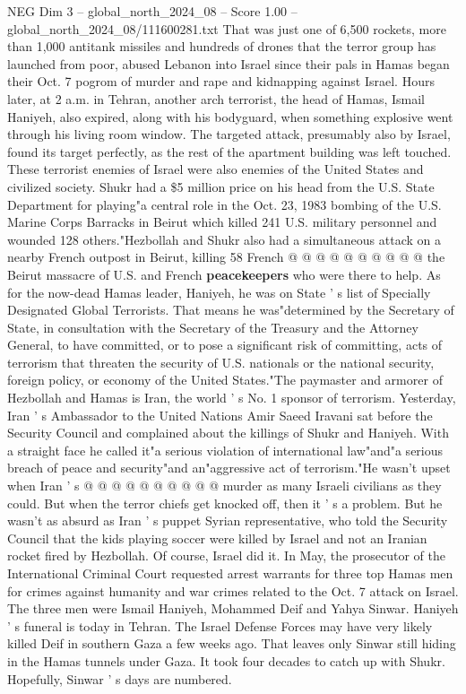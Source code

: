 \begin{textsample}{NEG Dim 3 – global\_north\_2024\_08 – Score 1.00 – global\_north\_2024\_08/111600281.txt}  \label{ex:f3_neg_316}
That was just one of 6,500 rockets, more than 1,000 antitank missiles and hundreds of drones that the terror group has launched from poor, abused Lebanon into Israel since their pals in Hamas began their Oct. 7 pogrom of murder and rape and kidnapping against Israel.
Hours later, at 2 a.m. in Tehran, another arch terrorist, the head of Hamas, Ismail Haniyeh, also expired, along with his bodyguard, when something explosive went through his living room window.
The targeted attack, presumably also by Israel, found its target perfectly, as the rest of the apartment building was left touched.
These terrorist enemies of Israel were also enemies of the United States and civilized society.
Shukr had a \$5 million price on his head from the U.S.
State Department for playing"a central role in the Oct. 23, 1983 bombing of the U.S.
Marine Corps Barracks in Beirut which killed 241 U.S. military personnel and wounded 128 others."Hezbollah and Shukr also had a simultaneous attack on a nearby French outpost in Beirut, killing 58 French @ @ @ @ @ @ @ @ @ @ the Beirut massacre of U.S. and French \textbf{peacekeepers} who were there to help.
As for the now-dead Hamas leader, Haniyeh, he was on State ' s list of Specially Designated Global Terrorists.
That means he was"determined by the Secretary of State, in consultation with the Secretary of the Treasury and the Attorney General, to have committed, or to pose a significant risk of committing, acts of terrorism that threaten the security of U.S. nationals or the national security, foreign policy, or economy of the United States."The paymaster and armorer of Hezbollah and Hamas is Iran, the world ' s No. 1 sponsor of terrorism.
Yesterday, Iran ' s Ambassador to the United Nations Amir Saeed Iravani sat before the Security Council and complained about the killings of Shukr and Haniyeh.
With a straight face he called it"a serious violation of international law"and"a serious breach of peace and security"and an"aggressive act of terrorism."He wasn't upset when Iran ' s @ @ @ @ @ @ @ @ @ @ murder as many Israeli civilians as they could.
But when the terror chiefs get knocked off, then it ' s a problem.
But he wasn't as absurd as Iran ' s puppet Syrian representative, who told the Security Council that the kids playing soccer were killed by Israel and not an Iranian rocket fired by Hezbollah.
Of course, Israel did it.
In May, the prosecutor of the International Criminal Court requested arrest warrants for three top Hamas men for crimes against humanity and war crimes related to the Oct. 7 attack on Israel.
The three men were Ismail Haniyeh, Mohammed Deif and Yahya Sinwar.
Haniyeh ' s funeral is today in Tehran.
The Israel Defense Forces may have very likely killed Deif in southern Gaza a few weeks ago.
That leaves only Sinwar still hiding in the Hamas tunnels under Gaza.
It took four decades to catch up with Shukr.
Hopefully, Sinwar ' s days are numbered.

\end{textsample}
